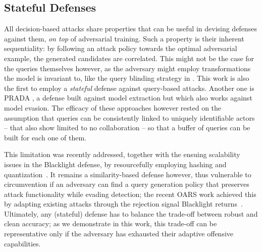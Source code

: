 \subsection{Stateful Defenses}
All decision-based attacks share properties that can be useful in devising defenses against them, \textit{on top} of adversarial training.
Such a property is their inherent sequentiality: by following an attack policy towards the optimal adversarial example, the generated candidates are correlated.
This might not be the case for the queries themselves however, as the adversary might employ transformations the model is invariant to, like the query blinding strategy in \cite{chen2020stateful}.
This work is also the first to employ a \emph{stateful} defense against query-based attacks.
Another one is PRADA \cite{juuti2019prada}, a defense built against model extraction but which also works against model evasion.
The efficacy of these approaches however rested on the assumption that queries can be consistently linked to uniquely identifiable actors -- that also show limited to no collaboration -- so that a buffer of queries can be built for each one of them.

This limitation was recently addressed, together with the ensuing scalability issues in the Blacklight defense, by resourcefully employing hashing and quantization~\cite{li2022blacklight}.
It remains a similarity-based defense however, thus vulnerable to circumvention if an adversary can find a query generation policy that preserves attack functionality while evading detection; the recent OARS work achieved this by adapting existing attacks through the rejection signal Blacklight returns~\cite{feng2023stateful}.
Ultimately, any (stateful) defense has to balance the trade-off between robust and clean accuracy; as we demonstrate in this work, this trade-off can be representative only if the adversary has exhausted their adaptive offensive capabilities.


